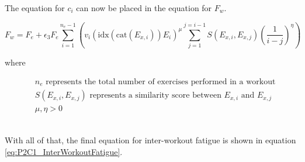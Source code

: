 The equation for $c_i$ can now be placed in the equation for $F_w$.

\begin{minipage}{\textwidth}
	\begin{equation*}
		F_w =
			F_{e} + 
			\epsilon_3 F_e 
			\sum_{i=1}^{n_e-1} \left( 
				v_i \left(
					\text{idx}(\text{cat}(E_{x,i})) E_i
				\right)^\mu 
				\sum_{j=1}^{j=i-1} S(E_{x,i},E_{x,j})\left(
					\frac{1}{i-j}
				\right)^\eta
			\right)
	\end{equation*}
	\centerline{where}
	\begin{equation*}
		\begin{split}
			& n_e \text{ represents the total number of exercises performed in a workout} \\
			& S(E_{x,i},E_{x,j}) \text{ represents a similarity score between } E_{x,i} \text{ and } E_{x,j} \\
			& \mu, \eta>0
		\end{split}
	\end{equation*}
\end{minipage}\\

With all of that, the final equation for inter-workout fatigue is shown in equation \ref{eq:P2C1_InterWorkoutFatigue}.

